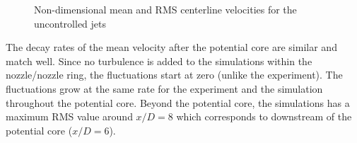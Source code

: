 \documentclass[english]{aiaa-tc}
\begin{document}
\begin{figure}
\begin{center}
\label{expcompNC}
\caption{Non-dimensional mean and RMS centerline velocities for the uncontrolled jets}
\end{center}
 \end{figure}
The decay rates of the mean velocity after the potential core are similar and match well.
Since no turbulence is added to the simulations within the nozzle/nozzle ring, the fluctuations start at zero (unlike the experiment). The fluctuations grow at the same rate for the experiment and the simulation throughout the potential core. Beyond the potential core, the simulations has a maximum RMS value around $x/D=8$ which corresponds to downstream of the potential core ($x/D=6$).
\end{document}
